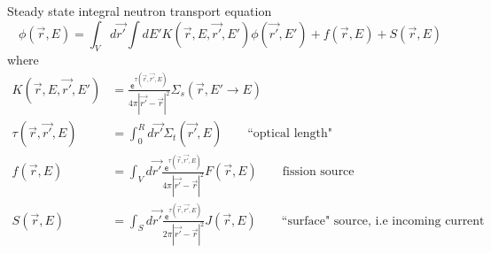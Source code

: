 \documentclass[12pt]{article}
\newcommand{\Macro}{\ensuremath{\Sigma}}
\begin{document}
Steady state integral neutron transport equation
%
\begin{equation}
\phi(\vec{r}, E) = \int_V d\vec{r'} \int dE' K(\vec{r}, E, \vec{r'}, E') \phi(\vec{r'}, E') + f(\vec{r}, E) + S(\vec{r}, E) \nonumber
\end{equation}
%
where
\begin{align}
K(\vec{r}, E, \vec{r'}, E') &= \frac{\mathsf{e}^{\tau(\vec{r}, \vec{r'}, E)}}{4\pi |\vec{r'} - \vec{r}|^2} \Macro_s(\vec{r}, E' \rightarrow E) \nonumber \\
%
\tau(\vec{r}, \vec{r'}, E) &= \int_0^R d\vec{r'} \Macro_t(\vec{r'}, E) \qquad \text{``optical length"} \nonumber \\
%
f(\vec{r}, E) &= \int_V d\vec{r'}\frac{\mathsf{e}^{\tau(\vec{r}, \vec{r'}, E)}}{4\pi |\vec{r'} - \vec{r}|^2} F(\vec{r}, E) \qquad \text{fission source}\nonumber \\
%
S(\vec{r}, E) &= \int_S d\vec{r'}\frac{\mathsf{e}^{\tau(\vec{r}, \vec{r'}, E)}}{2\pi |\vec{r'} - \vec{r}|^2} J(\vec{r}, E) \qquad \text{``surface" source, i.e\ incoming current} \nonumber
\end{align}
\end{document}
